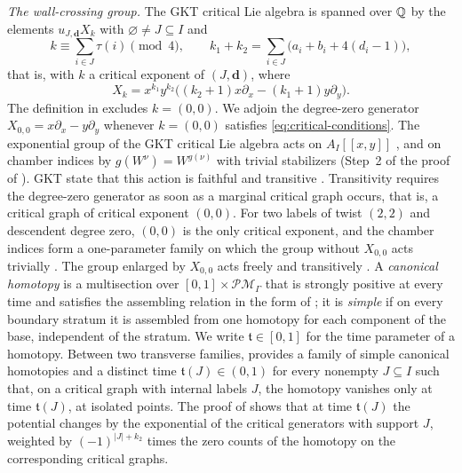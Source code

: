 \emph{The wall-crossing group.}  The GKT critical Lie algebra
\cite[Def.~4.23]{grossetal2022open} is spanned over $\mathbb Q$ by the elements
$u_{J,\mathbf d}X_k$ with $\varnothing\neq J\subseteq I$ and
\begin{equation}\label{eq:critical-conditions}
 k\equiv\sum_{i\in J}\tau(i)\pmod4,
 \qquad
 k_1+k_2=\sum_{i\in J}\bigl(a_i+b_i+4(d_i-1)\bigr),
\end{equation}
that is, with $k$ a critical exponent of $(J,\mathbf d)$, where
\begin{equation}\label{eq:GKT-generator}
 X_k=x^{k_1}y^{k_2}
 \bigl((k_2+1)x\partial_x-(k_1+1)y\partial_y\bigr).
\end{equation}
The definition in \cite{grossetal2022open} excludes $k=(0,0)$.  We adjoin
the degree-zero generator $X_{0,0}=x\partial_x-y\partial_y$ whenever
$k=(0,0)$ satisfies \eqref{eq:critical-conditions}.  The exponential group of
the GKT critical Lie algebra acts on $A_I[[x,y]]$ \cite[Def.~4.19 and
(4.18)]{grossetal2022open}, and on chamber indices by
$g(W^\nu)=W^{g(\nu)}$ with trivial stabilizers (Step~2 of the proof of
\cite[Thm.~4.27]{grossetal2022open}).  GKT state that this action is
faithful and transitive \cite[Thm.~4.27 and Cor.~5.14]{grossetal2022open}.
Transitivity requires the degree-zero generator as soon as a marginal
critical graph occurs, that is, a critical graph of critical exponent
$(0,0)$.  For two labels of twist $(2,2)$ and descendent degree zero,
$(0,0)$ is the only critical exponent, and the chamber indices form a
one-parameter family on which the group without $X_{0,0}$ acts trivially
\cite[Rem.~2.3]{wuebben2026boundary}.  The group enlarged by $X_{0,0}$ acts
freely and transitively \cite[Lem.~2.5]{wuebben2026boundary}.  A \emph{canonical
homotopy} is a multisection over $[0,1]\times\mathcal{PM}_\Gamma$ that is
strongly positive at every time and satisfies the assembling relation in the
form of \cite[Def.~3.36]{grossetal2022open}; it is \emph{simple} if on every
boundary stratum it is assembled from one homotopy for each component of the
base, independent of the stratum.  We write $\mathfrak t\in[0,1]$ for the time
parameter of a homotopy.  Between two transverse families,
\cite[Lem.~3.40]{grossetal2022open} provides a family of simple canonical
homotopies and a distinct time $\mathfrak t(J)\in(0,1)$ for every nonempty
$J\subseteq I$ such that, on a critical graph with internal labels $J$, the
homotopy vanishes only at time $\mathfrak t(J)$, at isolated points.  The proof of
\cite[Thm.~5.9]{grossetal2022open} shows that at time $\mathfrak t(J)$ the
potential changes by the exponential of the critical generators with support
$J$, weighted by $(-1)^{|J|+k_2}$ times the zero counts of the homotopy on the
corresponding critical graphs.

